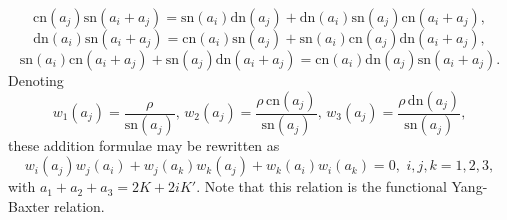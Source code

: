 \documentclass[fleqn,11pt,twoside]{article}
\theoremstyle{definition}
\begin{document}
\begin{equation}
\text{cn}(a_j)\text{sn}(a_i+a_j)=\text{sn}(a_i)\text{dn}(a_j)+\text{dn}(a_i)\text{sn}(a_j)\text{cn}(a_i+a_j),
\end{equation}
\begin{equation}
\text{dn}(a_i)\text{sn}(a_i+a_j)=\text{cn}(a_i)\text{sn}(a_j)+\text{sn}(a_i)\text{cn}(a_j)\text{dn}(a_i+a_j),
\end{equation}
\begin{equation}
\text{sn}(a_i)\text{cn}(a_i+a_j)+\text{sn}(a_j)\text{dn}(a_i+a_j)=\text{cn}(a_i)\text{dn}(a_j)\text{sn}(a_i+a_j).
\end{equation}
Denoting
\begin{equation}
w_1(a_j)=\frac{\rho}{\text{sn}(a_j)},\,w_2(a_j)=\frac{\rho\,\text{cn}(a_j)}{\text{sn}(a_j)},\,w_3(a_j)=\frac{\rho\,\text{dn}(a_j)}{\text{sn}(a_j)},
\end{equation}
these addition formulae may be rewritten as
\begin{equation}
w_i(a_j)w_j(a_i)+w_j(a_k)w_k(a_j)+w_k(a_i)w_i(a_k)=0,\, \,i,j,k=1,2,3,
\end{equation}
with $a_1+a_2+a_3=2K+2iK'$. Note that this relation is the functional Yang-Baxter relation\cite{Baxter}.
\end{document}
